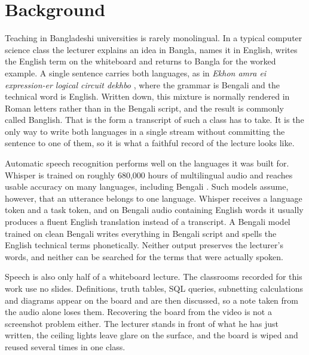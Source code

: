 

\section{Background}

Teaching in Bangladeshi universities is rarely monolingual. In a typical computer science
class the lecturer explains an idea in Bangla, names it in English, writes the English
term on the whiteboard and returns to Bangla for the worked example. A single sentence
carries both languages, as in \textit{Ekhon amra ei expression-er logical circuit dekhbo
}, where the grammar
is Bengali and the technical word is English. Written down, this mixture is normally
rendered in Roman letters rather than in the Bengali script, and the result is commonly
called Banglish. That is the form a transcript of such a class has to take. It is the
only way to write both languages in a single stream without committing the sentence to
one of them, so it is what a faithful record of the lecture looks like.

Automatic speech recognition performs well on the languages it was built for. Whisper is
trained on roughly 680,000 hours of multilingual audio and reaches usable accuracy on
many languages, including Bengali \cite{radford2023whisper}. Such models assume, however,
that an utterance belongs to one language. Whisper receives a language token and a task
token, and on Bengali audio containing English words it usually produces a fluent English
translation instead of a transcript. A Bengali model trained on clean Bengali writes
everything in Bengali script and spells the English technical terms phonetically. Neither
output preserves the lecturer's words, and neither can be searched for the terms that
were actually spoken.

Speech is also only half of a whiteboard lecture. The classrooms recorded for this work
use no slides. Definitions, truth tables, SQL queries, subnetting calculations and
diagrams appear on the board and are then discussed, so a note taken from the audio alone
loses them. Recovering the board from the video is not a screenshot problem either. The
lecturer stands in front of what he has just written, the ceiling lights leave glare on
the surface, and the board is wiped and reused several times in one class.

